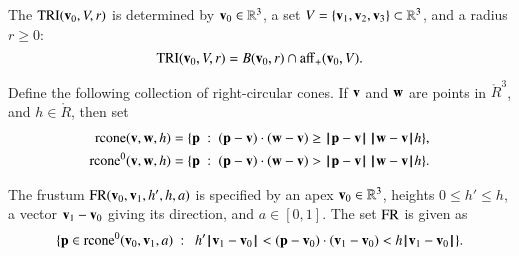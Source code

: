 %

\begin{definition}
 The 
${\operatorname{TRI}}({\mathbf v}_0,V,r)$ is determined by ${\mathbf v}_0\in\mathbb{R}^3$, a 
set $V=\{{\mathbf v}_1,{\mathbf v}_2,{\mathbf v}_3\}\subset\mathbb{R}^3$, and a radius $r\ge0$:
\[ 
{\operatorname{TRI}}({\mathbf v}_0,V,r) = 
B({\mathbf v}_0,r)\cap {\operatorname{aff}}_+({\mathbf v}_0,V).
\] 
%
%
%
\end{definition}




%

\begin{definition}[rcone]\label{def:p:rcone}
%
Define the following collection of right-circular cones.
If ${\mathbf v}$ and ${\mathbf w}$ are points in $\ring{R}^3$, and
$h\in\ring{R}$, then set
\begin{align*}
\op{rcone}(\v,\w,h) 
&= \{\p\mid (\p-\v)\cdot (\w-\v) \ge \norm{\p}{\v}\,\norm{\w}{\v} h\},\\
\op{rcone}^0(\v,\w,h) 
&= \{\p\mid (\p-\v)\cdot (\w-\v) > \norm{\p}{\v}\,\norm{\w}{\v} h\}.\\
\end{align*}
\end{definition}
%
%
%
%


\begin{definition}[frustum, FR]
 The frustum
${\operatorname{FR}}({\mathbf v}_0,{\mathbf v}_1,h',h,a)$ is specified by an apex
${\mathbf v}_0\in\mathbb{R}^3$, heights $0\le h'\le h$, a vector ${\mathbf v}_1-{\mathbf v}_0$
giving its direction, and $a\in[0,1]$. The set ${\operatorname{FR}}$ is given as
\[ 
\{ \p \in\op{rcone}^0(\v_0,\v_1,a) \mid \ 
h'\norm{\v_1}{\v_0} < (\p-\v_0) \cdot (\v_1-\v_0) < h\norm{\v_1}{\v_0} \}.
\] 
%
%
%
\end{definition}

